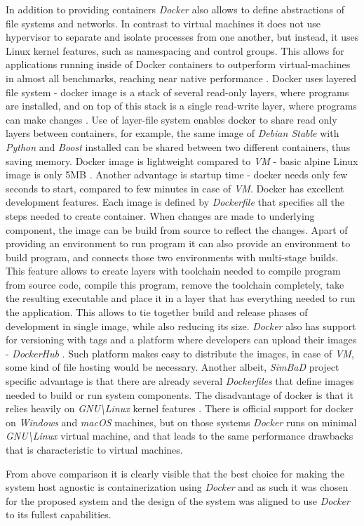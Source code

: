 In addition to providing containers \textit{Docker} also allows to define abstractions of file systems and networks. In contrast to virtual machines it does not use hypervisor to separate and isolate processes from one another, but instead, it uses Linux kernel features, such as namespacing and control groups. This allows for applications running inside of Docker containers to outperform virtual-machines in almost all benchmarks, reaching near native performance \cite{Felter2015}. Docker uses layered file system - docker image is a stack of several read-only layers, where programs are installed, and on top of this stack is a single read-write layer, where programs can make changes \cite{DockerStorage}. Use of layer-file system enables docker to share read only layers between containers, for example, the same image of \textit{Debian Stable} with \textit{Python} and \textit{Boost} installed can be shared between two different containers, thus saving memory. Docker image is lightweight compared to \textit{VM} - basic alpine Linux image is only 5MB \cite{Alpine}. Another advantage is startup time - docker needs only few seconds to start, compared to few minutes in case of \textit{VM}. 
Docker has excellent development features. Each image is defined by \textit{Dockerfile} that specifies all the steps needed to create container. When changes are made to underlying component, the image can be build from source to reflect the changes. Apart of providing an environment to run program it can also provide an environment to build program, and connects those two environments with multi-stage builds. This feature allows to create layers with toolchain needed to compile program from source code, compile this program, remove the toolchain completely, take the resulting executable and place it in a layer that has everything needed to run the application. This allows to tie together build and release phases of development in single image, while also reducing its size. \textit{Docker} also has support for versioning with tags \cite{DockerTag} and a platform where developers can upload their images - \textit{DockerHub} \cite{DockerHub}. Such platform makes easy to distribute the images, in case of \textit{VM}, some kind of file hosting would be necessary. Another albeit, \textit{SimBaD} project specific advantage is that there are already several \textit{Dockerfiles} that define images needed to build or run system components.
The disadvantage of docker is that it relies heavily on \textit{GNU\textbackslash Linux} kernel features \cite{DockerOverview}. There is official support for docker on \textit{Windows} and \textit{macOS} machines, but on those systems \textit{Docker} runs on minimal \textit{GNU\textbackslash Linux} virtual machine, and that leads to the same performance drawbacks that is characteristic to virtual machines. 

From above comparison it is clearly visible that the best choice for making the system host agnostic is containerization using \textit{Docker} and as such it was chosen for the proposed system and the design of the system was aligned to use \textit{Docker} to its fullest capabilities.

